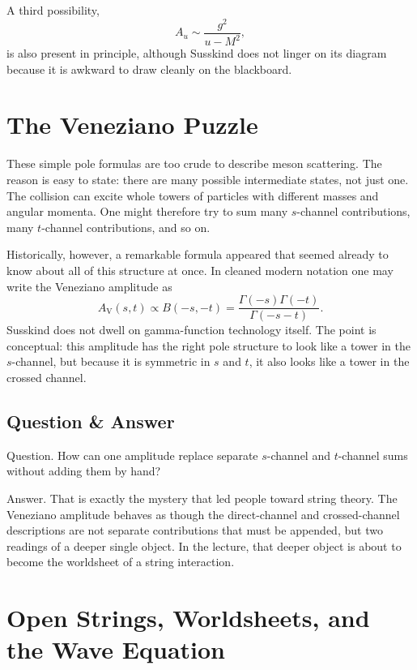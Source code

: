 A third possibility,
\begin{equation}
A_u \sim \frac{g^2}{u-M^2},
\end{equation}
is also present in principle, although Susskind does not linger on its diagram because it is awkward to draw cleanly on the blackboard.

\section{The Veneziano Puzzle}

These simple pole formulas are too crude to describe meson scattering. The reason is easy to state: there are many possible intermediate states, not just one. The collision can excite whole towers of particles with different masses and angular momenta. One might therefore try to sum many \(s\)-channel contributions, many \(t\)-channel contributions, and so on.

Historically, however, a remarkable formula appeared that seemed already to know about all of this structure at once. In cleaned modern notation one may write the Veneziano amplitude as
\begin{equation}
A_{\mathrm V}(s,t)\propto B(-s,-t)=\frac{\Gamma(-s)\Gamma(-t)}{\Gamma(-s-t)}.
\end{equation}
Susskind does not dwell on gamma-function technology itself. The point is conceptual: this amplitude has the right pole structure to look like a tower in the \(s\)-channel, but because it is symmetric in \(s\) and \(t\), it also looks like a tower in the crossed channel.

\subsection{Question \& Answer}

Question. How can one amplitude replace separate \(s\)-channel and \(t\)-channel sums without adding them by hand?

Answer. That is exactly the mystery that led people toward string theory. The Veneziano amplitude behaves as though the direct-channel and crossed-channel descriptions are not separate contributions that must be appended, but two readings of a deeper single object. In the lecture, that deeper object is about to become the worldsheet of a string interaction.

\section{Open Strings, Worldsheets, and the Wave Equation}

